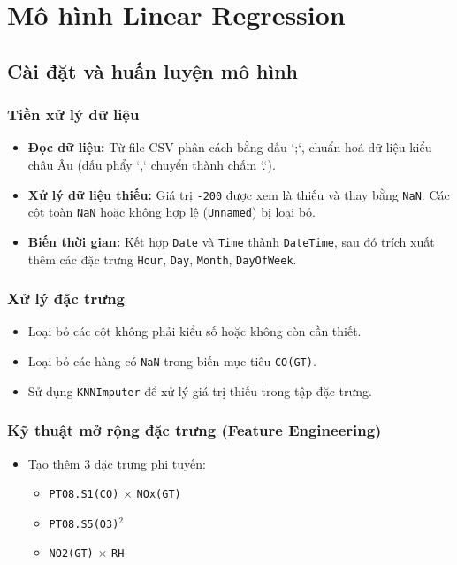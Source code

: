 \section{Mô hình Linear Regression}
\subsection{Cài đặt và huấn luyện mô hình}

\subsubsection{Tiền xử lý dữ liệu}
\begin{itemize}
    \item \textbf{Đọc dữ liệu:} Từ file CSV phân cách bằng dấu `;`, chuẩn hoá dữ liệu kiểu châu Âu (dấu phẩy `,` chuyển thành chấm `.`).
    \item \textbf{Xử lý dữ liệu thiếu:} Giá trị \texttt{-200} được xem là thiếu và thay bằng \texttt{NaN}. Các cột toàn \texttt{NaN} hoặc không hợp lệ (\texttt{Unnamed}) bị loại bỏ.
    \item \textbf{Biến thời gian:} Kết hợp \texttt{Date} và \texttt{Time} thành \texttt{DateTime}, sau đó trích xuất thêm các đặc trưng \texttt{Hour}, \texttt{Day}, \texttt{Month}, \texttt{DayOfWeek}.
\end{itemize}

\subsubsection{Xử lý đặc trưng}
\begin{itemize}
    \item Loại bỏ các cột không phải kiểu số hoặc không còn cần thiết.
    \item Loại bỏ các hàng có \texttt{NaN} trong biến mục tiêu \texttt{CO(GT)}.
    \item Sử dụng \texttt{KNNImputer} để xử lý giá trị thiếu trong tập đặc trưng.
\end{itemize}

\subsubsection{Kỹ thuật mở rộng đặc trưng (Feature Engineering)}
\begin{itemize}
    \item Tạo thêm 3 đặc trưng phi tuyến:
    \begin{itemize}
        \item \texttt{PT08.S1(CO)} $\times$ \texttt{NOx(GT)}
        \item \texttt{PT08.S5(O3)}$^2$
        \item \texttt{NO2(GT)} $\times$ \texttt{RH}
    \end{itemize}
\end{itemize}

